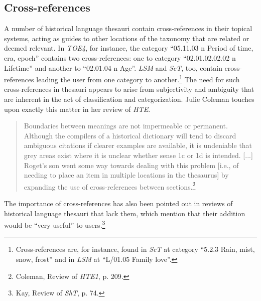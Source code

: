 \subsection{Cross-references}
\label{sect:Stolk_thes-content:CrossReferences}
A number of historical language thesauri contain cross-references in their topical systems, acting as guides to other locations of the taxonomy that are related or deemed relevant. In \textit{TOE4}, for instance, the category ``05.11.03 n Period of time, era, epoch'' contains two cross-references: one to category ``02.01.02.02.02 n Lifetime'' and another to ``02.01.04 n Age''. \textit{LSM} and \textit{ScT}, too, contain cross-references leading the user from one category to another.\footnote{Cross-references are, for instance, found in \textit{ScT} at category ``5.2.3 Rain, mist, snow, frost'' and in \textit{LSM} at ``L/01.05 Family love''.} The need for such cross-references in thesauri appears to arise from subjectivity and ambiguity that are inherent in the act of classification and categorization. Julie Coleman touches upon exactly this matter in her review of \textit{HTE}.
\begin{quotation} \noindent
Boundaries between meanings are not impermeable or permanent. Although the compilers of a historical dictionary will tend to discard ambiguous citations if clearer examples are available, it is undeniable that grey areas exist where it is unclear whether sense 1c or 1d is intended. [...] Roget's son went some way towards dealing with this problem [i.e., of needing to place an item in multiple locations in the thesaurus] by expanding the use of cross-references between sections.\footnote{Coleman, Review of \textit{HTE1}, p. 209.}
\end{quotation}
The importance of cross-references has also been pointed out in reviews of historical language thesauri that lack them, which mention that their addition would be ``very useful'' to users.\footnote{Kay, Review of \textit{ShT}, %
p. 74.}

